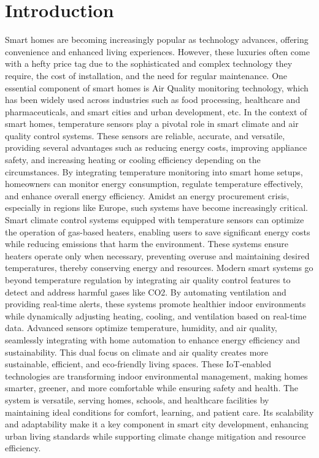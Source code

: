 \documentclass[a4paper]{scrartcl}
\begin{document}
\section{Introduction}
Smart homes are becoming increasingly popular as technology advances, offering convenience and enhanced living experiences. However, these luxuries often come with a hefty price tag due to the sophisticated and complex technology they require, the cost of installation, and the need for regular maintenance. \cite{r4}\cite{r9} One essential component of smart homes is Air Quality monitoring technology, which has been widely used across industries such as food processing, healthcare and pharmaceuticals, and smart cities and urban development, etc. In the context of smart homes, temperature sensors play a pivotal role in smart climate and air quality control systems. These sensors are reliable, accurate, and versatile, providing several advantages such as reducing energy costs, improving appliance safety, and increasing heating or cooling efficiency depending on the circumstances. By integrating temperature monitoring into smart home setups,\cite{r10} homeowners can monitor energy consumption, regulate temperature effectively, and enhance overall energy efficiency. Amidst an energy procurement crisis, especially in regions like Europe, such systems have become increasingly critical. Smart climate control systems equipped with temperature sensors can optimize the operation of gas-based heaters, enabling users to save significant energy costs while reducing emissions that harm the environment. These systems ensure heaters operate only when necessary, preventing overuse and maintaining desired temperatures, thereby conserving energy and resources. Modern smart systems go beyond temperature regulation by integrating air quality control features to detect and address harmful gases like CO2.\cite{r11} By automating ventilation and providing real-time alerts, these systems promote healthier indoor environments while dynamically adjusting heating, cooling, and ventilation based on real-time data. Advanced sensors optimize temperature, humidity, and air quality, seamlessly integrating with home automation to enhance energy efficiency and sustainability. This dual focus on climate and air quality creates more sustainable, efficient, and eco-friendly living spaces. These IoT-enabled technologies are transforming indoor environmental management, making homes smarter, greener, and more comfortable while ensuring safety and health. The system is versatile, serving homes, schools, and healthcare facilities by maintaining ideal conditions for comfort, learning, and patient care. Its scalability and adaptability make it a key component in smart city development, enhancing urban living standards while supporting climate change mitigation and resource efficiency.\cite{r13}
\end{document}
